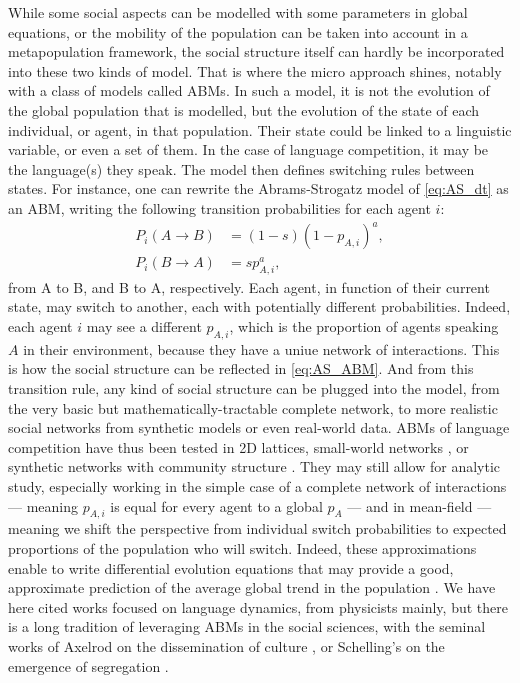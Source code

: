 \documentclass[../thesis.tex]{subfiles}
\begin{document}
While some social aspects can be modelled with some parameters in global equations, or
the mobility of the population can be taken into account in a metapopulation framework,
the social structure itself can hardly be incorporated into these two kinds of model.
That is where the micro approach shines, notably with a class of models called
\acp{ABM}. In such a model, it is not the evolution of the global population that is
modelled, but the evolution of the state of each individual, or agent, in that
population. Their state could be linked to a linguistic variable, or even a set of them.
In the case of language competition, it may be the language(s) they speak. The model
then defines switching rules between states. For instance, one can rewrite the
Abrams-Strogatz model of \cref{eq:AS_dt} as an \ac{ABM}, writing the following
transition probabilities for each agent $i$:
\begin{equation}
  \label{eq:AS_ABM}
  \begin{aligned}
    P_i(A \rightarrow B) &= (1 - s) (1 - p_{A, i})^a, \\
    P_i(B \rightarrow A) &= s p_{A, i}^a,
  \end{aligned}
\end{equation}
from A to B, and B to A, respectively. Each agent, in function of their current state,
may switch to another, each with potentially different probabilities. Indeed, each agent
$i$ may see a different $p_{A, i}$, which is the proportion of agents speaking $A$ in
their environment, because they have a uniue network of interactions. This is how the
social structure can be reflected in \cref{eq:AS_ABM}. And from this transition rule,
any kind of social structure can be plugged into the model, from the very basic but
mathematically-tractable complete network, to more realistic social networks from
synthetic models or even real-world data. \Acp{ABM} of language competition have thus
been tested in 2D lattices, small-world networks \cite{WattsCollectiveDynamics1998}, or
synthetic networks with community structure
\cite{CastelloOrderingDynamics2006,MinettModellingEndangered2008,CaridiSchellingvoterModel2013,CastelloAgentbasedModels2013,VazquezAgentBased2010}.
They may still allow for analytic study, especially working in the simple case of a
complete network of interactions --- meaning $p_{A, i}$ is equal for every agent to a
global $p_A$ --- and in mean-field --- meaning we shift the perspective from individual
switch probabilities to expected proportions of the population who will switch. Indeed,
these approximations enable to write differential evolution equations that may provide a
good, approximate prediction of the average global trend in the population
\cite{VazquezAgentBased2010}. We have here cited works focused on language dynamics,
from physicists mainly, but there is a long tradition of leveraging \acp{ABM} in the
social sciences, with the seminal works of Axelrod on the dissemination of culture
\cite{AxelrodDisseminationCulture1997}, or Schelling's on the emergence of segregation
\cite{SchellingDynamicModels1971}.
\end{document}
